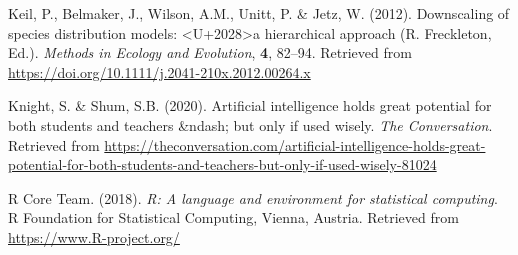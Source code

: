 \documentclass[]{article}
\begin{document}
\leavevmode\hypertarget{ref-Keil_2012}{}%
Keil, P., Belmaker, J., Wilson, A.M., Unitt, P. \& Jetz, W. (2012).
Downscaling of species distribution models:
\textless U+2028\textgreater a hierarchical approach (R. Freckleton,
Ed.). \emph{Methods in Ecology and Evolution}, \textbf{4}, 82--94.
Retrieved from \url{https://doi.org/10.1111/j.2041-210x.2012.00264.x}

\leavevmode\hypertarget{ref-greycite380215}{}%
Knight, S. \& Shum, S.B. (2020). Artificial intelligence holds great
potential for both students and teachers \&ndash; but only if used
wisely. \emph{The Conversation}. Retrieved from
\url{https://theconversation.com/artificial-intelligence-holds-great-potential-for-both-students-and-teachers-but-only-if-used-wisely-81024}

\leavevmode\hypertarget{ref-R_Core_Team_2018}{}%
R Core Team. (2018). \emph{R: A language and environment for statistical
computing}. R Foundation for Statistical Computing, Vienna, Austria.
Retrieved from \url{https://www.R-project.org/}
\end{document}
